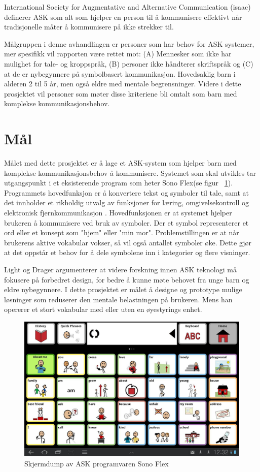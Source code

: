 \documentclass[phd,tocprelim]{cornell}
\begin{document}
International Society for Augmentative and Alternative Communication (\gls{isaac}) \cite{HvaErASK} definerer ASK som alt som hjelper en person til å kommunisere effektivt når tradisjonelle måter å kommunisere på ikke strekker til.

Målgruppen i denne avhandlingen er personer som har behov for ASK systemer, mer spesifikk vil rapporten være rettet mot: (A) Mennesker som ikke har mulighet for tale- og kroppspråk,  (B) personer ikke håndterer skriftspråk og (C) at de er nybegynnere på symbolbasert kommunikasjon. Hovedsaklig barn i alderen 2 til 5 år, men også eldre med mentale begrensninger. Videre i dette prosjektet vil personer som møter disse kriteriene bli omtalt som barn med komplekse kommunikasjonsbehov. 

\section{Mål}
\label{sec:goal}

Målet med dette prosjektet er å lage et ASK-system som hjelper barn med komplekse kommunikasjonsbehov å kommunisere. Systemet som skal utvikles tar utgangspunkt i et eksisterende program som heter Sono Flex(se figur ~\ref{fig:SonoFlex}). Programmets hovedfunksjon er å konvertere tekst og symboler til tale, samt at det innholder et rikholdig utvalg av funksjoner for læring, omgivelsekontroll og elektronisk fjernkommunikasjon \cite{TobiiCommunicator}. Hovedfunksjonen er at systemet hjelper brukeren å kommunisere ved bruk av symboler. Der et symbol representerer et ord eller et konsept som "hjem" eller "min mor". Problemstillingen er at når brukerens aktive vokabular vokser, så vil også antallet symboler øke. Dette gjør at det oppstår et behov for å dele symbolene inn i kategorier og flere visninger.

Light og Drager \cite{aac} argumenterer at videre forskning innen ASK teknologi må fokusere på forbedret design, for bedre å kunne møte behovet fra unge barn og eldre nybegynnere. I dette prosjektet er målet å designe og prototype mulige løsninger som reduserer den mentale belastningen på brukeren. Mens han opererer et stort vokabular med eller uten en øyestyrings enhet.

\begin{figure}[ht!]
\centering
\includegraphics[width=150mm]{SonoFlex2}
\caption{Skjermdump av ASK programvaren Sono Flex}
\label{fig:SonoFlex}
\end{figure}
\end{document}
